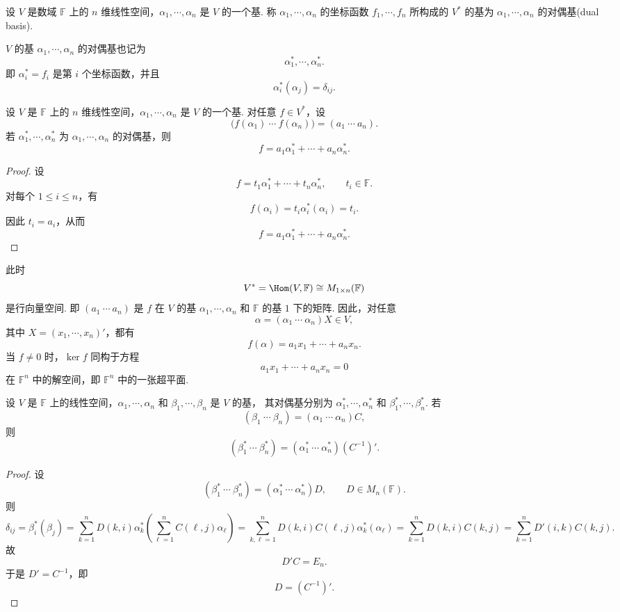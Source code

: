 \begin{definition}\label{p1:concept:c7-l150}
	设 $V$ 是数域 $\mathbb{F}$ 上的 $n$ 维线性空间，$\alpha_1,\cdots,\alpha_n$ 是 $V$ 的一个基.
	称 $\alpha_1,\cdots,\alpha_n$ 的坐标函数 $f_1,\cdots,f_n$ 所构成的 $V^*$ 的基为
	$\alpha_1,\cdots,\alpha_n$ 的对偶基(dual basis).
\end{definition}


	$V$ 的基 $\alpha_1,\cdots,\alpha_n$ 的对偶基也记为
	\[
	\alpha_1^*,\cdots,\alpha_n^*.
	\]
	即 $\alpha_i^*=f_i$ 是第 $i$ 个坐标函数，并且
	\[
	\alpha_i^*(\alpha_j)=\delta_{ij}.
	\]


\begin{lemma}
	设 $V$ 是 $\mathbb{F}$ 上的 $n$ 维线性空间，$\alpha_1,\cdots,\alpha_n$ 是 $V$ 的一个基.
	对任意 $f\in V^*$，设
	\[
	\bigl(f(\alpha_1)\ \cdots\ f(\alpha_n)\bigr)=(a_1\ \cdots\ a_n).
	\]
	若 $\alpha_1^*,\cdots,\alpha_n^*$ 为 $\alpha_1,\cdots,\alpha_n$ 的对偶基，则
	\[
	f=a_1\alpha_1^*+\cdots+a_n\alpha_n^*.
	\]
\end{lemma}

\begin{proof}
	设
	\[
	f=t_1\alpha_1^*+\cdots+t_n\alpha_n^*,\qquad t_i\in\mathbb{F}.
	\]
	对每个 $1\leq i\leq n$，有
	\[
	f(\alpha_i)=t_i\alpha_i^*(\alpha_i)=t_i.
	\]
	因此 $t_i=a_i$，从而
	\[
	f=a_1\alpha_1^*+\cdots+a_n\alpha_n^*.
	\]
\end{proof}


	此时
	\[
	V^*=\Hom(V,\mathbb{F})\cong M_{1\times n}(\mathbb{F})
	\]
	是行向量空间. 即 $(a_1\ \cdots\ a_n)$ 是 $f$ 在 $V$ 的基 $\alpha_1,\cdots,\alpha_n$ 和
	$\mathbb{F}$ 的基 $1$ 下的矩阵.
	因此，对任意
	\[
	\alpha=(\alpha_1\ \cdots\ \alpha_n)X\in V,
	\]
	其中 $X=(x_1,\cdots,x_n)'$，都有
	\[
	f(\alpha)=a_1x_1+\cdots+a_nx_n.
	\]
	当 $f\ne0$ 时，$\ker f$ 同构于方程
	\[
	a_1x_1+\cdots+a_nx_n=0
	\]
	在 $\mathbb{F}^n$ 中的解空间，即 $\mathbb{F}^n$ 中的一张超平面.


\begin{lemma}
	设 $V$ 是 $\mathbb{F}$ 上的线性空间，$\alpha_1,\cdots,\alpha_n$ 和 $\beta_1,\cdots,\beta_n$ 是 $V$ 的基，
	其对偶基分别为 $\alpha_1^*,\cdots,\alpha_n^*$ 和 $\beta_1^*,\cdots,\beta_n^*$.
	若
	\[
	(\beta_1\ \cdots\ \beta_n)=(\alpha_1\ \cdots\ \alpha_n)C,
	\]
	则
	\[
	(\beta_1^*\ \cdots\ \beta_n^*)=(\alpha_1^*\ \cdots\ \alpha_n^*)(C^{-1})'.
	\]
\end{lemma}

\begin{proof}
	设
	\[
	(\beta_1^*\ \cdots\ \beta_n^*)=(\alpha_1^*\ \cdots\ \alpha_n^*)D,
	\qquad D\in M_n(\mathbb{F}).
	\]
	则
	\[
	\delta_{ij}
	=\beta_i^*(\beta_j)=\sum_{k=1}^nD(k,i)\alpha_k^*\left(\sum_{\ell=1}^n C(\ell,j)\alpha_\ell\right)=\sum_{k,\ell=1}^nD(k,i)C(\ell,j)\alpha_k^*(\alpha_\ell)=\sum_{k=1}^nD(k,i)C(k,j)=\sum_{k=1}^nD'(i,k)C(k,j).
	\]
	故
	\[
	D'C=E_n.
	\]
	于是 $D'=C^{-1}$，即
	\[
	D=(C^{-1})'.
	\]
\end{proof}

